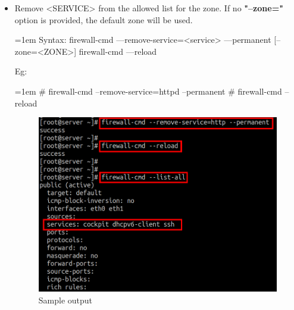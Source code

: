 \begin{flushleft}
\begin{itemize}
		\item Remove <SERVICE> from the allowed list for the zone. If no \textbf{"--zone="} option is provided, the default zone will be used.
		\bigskip
		\begin{tcolorbox}[breakable,notitle,boxrule=1pt,colback=pink,colframe=pink]
			\color{black}
			\font=1em
			Syntax: 
			\newline
			firewall-cmd ---remove-service=<service> ---permanent [--zone=<ZONE>]
			\newline
			\newline
			firewall-cmd ---reload
			\font=4pt
		\end{tcolorbox}	
		Eg:
		\begin{tcolorbox}[breakable,notitle,boxrule=-0pt,colback=black,colframe=black]
			\color{green}
			\font=1em
			\# firewall-cmd --remove-service=httpd --permanent 
			\newline
			\# firewall-cmd --reload
			\font=4pt
		\end{tcolorbox}
		\begin{figure}[h!]
			\centering
			\includegraphics[scale=0.4]{content/chapter2/images/zones7.png}
			\caption{Sample output}
			\label{fig:zones7}
		\end{figure}
		

\end{itemize}
\end{flushleft}
